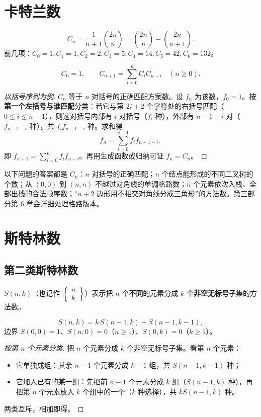\section{卡特兰数}
\begin{definition}[卡特兰数]
\[
C_n=\frac1{n+1}\binom{2n}{n}=\binom{2n}{n}-\binom{2n}{n+1}.
\]
前几项：$C_0=1,C_1=1,C_2=2,C_3=5,C_4=14,C_5=42,C_6=132$。
\end{definition}
\begin{theorem}[卡特兰数的递推]
\[
C_0=1,\qquad C_{n+1}=\sum_{i=0}^{n}C_iC_{n-i}\quad(n\ge0).
\]
\end{theorem}
\begin{proof}[以括号序列为例]
$C_n$ 等于 $n$ 对括号的正确匹配方案数。设 $f_n$ 为该数，$f_0=1$。按\textbf{第一个左括号与谁匹配}分类：若它与第 $2i+2$ 个字符处的右括号匹配（$0\le i\le n-1$），则这对括号内部有 $i$ 对括号（$f_i$ 种），外部有 $n-1-i$ 对（$f_{n-1-i}$ 种），共 $f_if_{n-1-i}$ 种。求和得
\[
f_n=\sum_{i=0}^{n-1}f_if_{n-1-i},
\]
即 $f_{n+1}=\sum_{i=0}^{n}f_if_{n-i}$。再用生成函数或归纳可证 $f_n=C_n$。
\end{proof}

\begin{tip}[卡特兰数的家族]
以下问题的答案都是 $C_n$：$n$ 对括号的正确匹配；$n$ 个结点能形成的不同二叉树的个数；从 $(0,0)$ 到 $(n,n)$ 不越过对角线的单调格路数；$n$ 个元素依次入栈、全部出栈的合法顺序数；“$n+2$ 边形用不相交对角线分成三角形”的方法数。第三部分第 6 章会详细处理格路版本。
\end{tip}

\section{斯特林数}
\subsection{第二类斯特林数}
\begin{definition}[第二类斯特林数]
$S(n,k)$（也记作 $\begin{Bmatrix}n\\k\end{Bmatrix}$）表示把 $n$ 个\textbf{不同}的元素分成 $k$ 个\textbf{非空无标号}子集的方法数。
\end{definition}
\begin{theorem}[第二类斯特林数的递推]
\[
S(n,k)=k\,S(n-1,k)+S(n-1,k-1),
\]
边界 $S(0,0)=1$、$S(n,0)=0$（$n\ge1$）、$S(0,k)=0$（$k\ge1$）。
\end{theorem}
\begin{proof}[按第 $n$ 个元素分类]
把 $n$ 个元素分成 $k$ 个非空无标号子集。看第 $n$ 个元素：
\begin{itemize}
\item 它单独成组：其余 $n-1$ 个元素分成 $k-1$ 组，共 $S(n-1,k-1)$ 种；
\item 它加入已有的某一组：先把前 $n-1$ 个元素分成 $k$ 组（$S(n-1,k)$ 种），再把第 $n$ 个元素放入 $k$ 个组中的一个（$k$ 种选择），共 $kS(n-1,k)$ 种。
\end{itemize}
两类互斥，相加即得。
\end{proof}

